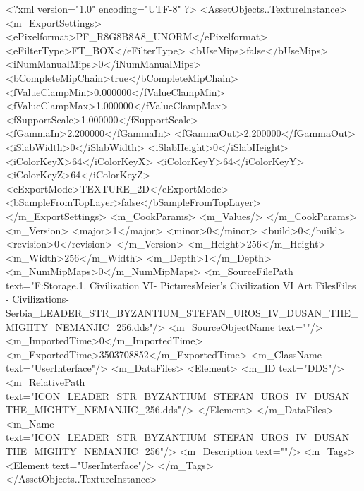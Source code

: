 <?xml version="1.0" encoding="UTF-8" ?>
<AssetObjects..TextureInstance>
	<m_ExportSettings>
		<ePixelformat>PF_R8G8B8A8_UNORM</ePixelformat>
		<eFilterType>FT_BOX</eFilterType>
		<bUseMips>false</bUseMips>
		<iNumManualMips>0</iNumManualMips>
		<bCompleteMipChain>true</bCompleteMipChain>
		<fValueClampMin>0.000000</fValueClampMin>
		<fValueClampMax>1.000000</fValueClampMax>
		<fSupportScale>1.000000</fSupportScale>
		<fGammaIn>2.200000</fGammaIn>
		<fGammaOut>2.200000</fGammaOut>
		<iSlabWidth>0</iSlabWidth>
		<iSlabHeight>0</iSlabHeight>
		<iColorKeyX>64</iColorKeyX>
		<iColorKeyY>64</iColorKeyY>
		<iColorKeyZ>64</iColorKeyZ>
		<eExportMode>TEXTURE_2D</eExportMode>
		<bSampleFromTopLayer>false</bSampleFromTopLayer>
	</m_ExportSettings>
	<m_CookParams>
		<m_Values/>
	</m_CookParams>
	<m_Version>
		<major>1</major>
		<minor>0</minor>
		<build>0</build>
		<revision>0</revision>
	</m_Version>
	<m_Height>256</m_Height>
	<m_Width>256</m_Width>
	<m_Depth>1</m_Depth>
	<m_NumMipMaps>0</m_NumMipMaps>
	<m_SourceFilePath text="F:\Mod Storage\2.1. Civilization VI\Mods\Archive - Pictures\Sid Meier's Civilization VI Art Files\Art Files - Civilizations\Civilization - Serbia\ICON_LEADER_STR_BYZANTIUM_STEFAN_UROS_IV_DUSAN_THE_MIGHTY_NEMANJIC_256.dds"/>
	<m_SourceObjectName text=""/>
	<m_ImportedTime>0</m_ImportedTime>
	<m_ExportedTime>3503708852</m_ExportedTime>
	<m_ClassName text="UserInterface"/>
	<m_DataFiles>
		<Element>
			<m_ID text="DDS"/>
			<m_RelativePath text="ICON_LEADER_STR_BYZANTIUM_STEFAN_UROS_IV_DUSAN_THE_MIGHTY_NEMANJIC_256.dds"/>
		</Element>
	</m_DataFiles>
	<m_Name text="ICON_LEADER_STR_BYZANTIUM_STEFAN_UROS_IV_DUSAN_THE_MIGHTY_NEMANJIC_256"/>
	<m_Description text=""/>
	<m_Tags>
		<Element text="UserInterface"/>
	</m_Tags>
</AssetObjects..TextureInstance>

